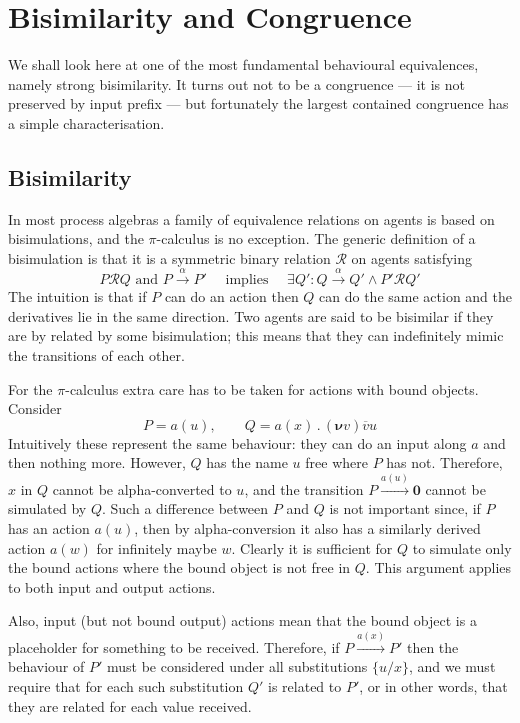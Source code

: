 \documentclass[10pt,a4paper]{article}
\newcommand{\resp}[1]{(\boldsymbol{\nu}#1)}
\newcommand{\res}[2]{\resp{#1}#2}
\newcommand{\nil}{\mathbf{0}}
\newcommand{\outp}[2]{\overline{#1}#2}
\newcommand{\inpp}[2]{#1(#2)}
\newcommand{\prefix}[2]{{#1}\,.\,#2}
\newcommand{\inp}[3]{\prefix{\inpp{#1}{#2}}{#3}}
\newcommand{\tran}[3]{#1 \overset{#2}{\longrightarrow} #3}
\begin{document}
\section{Bisimilarity and Congruence}

We shall look here at one of the most fundamental behavioural equivalences, namely strong bisimilarity. It turns out not to be a congruence --- it is not preserved by input prefix --- but fortunately the largest contained congruence has a simple characterisation.

\subsection{Bisimilarity}

In most process algebras a family of equivalence relations on agents is based on bisimulations, and the $\pi$-calculus is no exception. The generic definition of a bisimulation is that it is a symmetric binary relation $\mathcal{R}$ on agents satisfying
\[
P \mathcal{R} Q \text{ and } \tran{P}{\alpha}{P'} \quad \text{ implies } \quad \exists Q' : \tran{Q}{\alpha}{Q'} \wedge P' \mathcal{R} Q' 
\]
The intuition is that if $P$ can do an action then $Q$ can do the same action and the derivatives lie in the same direction. Two agents are said to be bisimilar if they are by related by some bisimulation; this means that they can indefinitely mimic the transitions of each other.

For the $\pi$-calculus extra care has to be taken for actions with bound objects. Consider
\[
P = \inpp{a}{u}, \qquad Q = \inp{a}{x}{\res{v}{\outp{v}{u}}}
\]
Intuitively these represent the same behaviour: they can do an input along $a$ and then nothing more. However, $Q$ has the name $u$ free where $P$ has not. Therefore, $x$ in $Q$ cannot be alpha-converted to $u$, and the transition $\tran{P}{\inpp{a}{u}}{\nil}$ cannot be simulated by $Q$. Such a difference between $P$ and $Q$ is not important since, if $P$ has an action $\inpp{a}{u}$, then by alpha-conversion it also has a similarly derived action $\inpp{a}{w}$ for infinitely maybe $w$. Clearly it is sufficient for $Q$ to simulate only the bound actions where the bound object is not free in $Q$. This argument applies to both input and output actions.

Also, input (but not bound output) actions mean that the bound object is a placeholder for something to be received. Therefore, if $\tran{P}{\inpp{a}{x}}{P'}$ then the behaviour of $P'$ must be considered under all substitutions $\{u/x\}$, and we must require that for each such substitution $Q'$ is related to $P'$, or in other words, that they are related for each value received.
\end{document}

